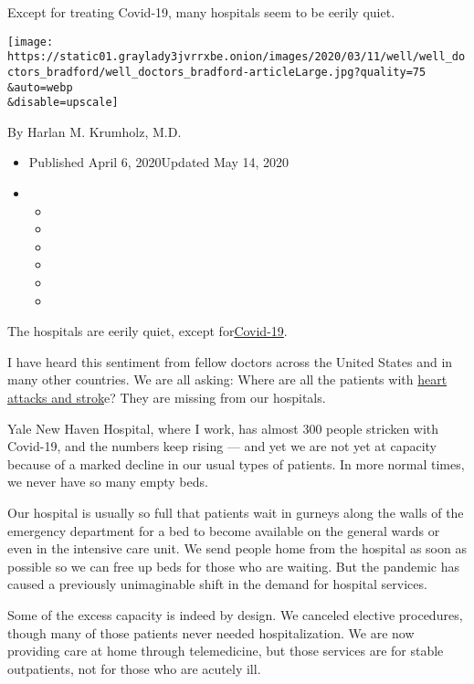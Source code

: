 Except for treating Covid-19, many hospitals seem to be eerily quiet.

\texttt{[image: https://static01.graylady3jvrrxbe.onion/images/2020/03/11/well/well\_doctors\_bradford/well\_doctors\_bradford-articleLarge.jpg?quality=75\\\&auto=webp\\\&disable=upscale]}

By Harlan M. Krumholz, M.D.

\begin{itemize}
\item
  Published April 6, 2020Updated May 14, 2020
\item
  \begin{itemize}
  \item
  \item
  \item
  \item
  \item
  \item
  \end{itemize}
\end{itemize}

The hospitals are eerily quiet, except
for\href{https://www.nytimes3xbfgragh.onion/2020/05/14/health/coronavirus-strokes.html}{Covid-19}.

I have heard this sentiment from fellow doctors across the United States
and in many other countries. We are all asking: Where are all the
patients with
\href{https://www.nytimes3xbfgragh.onion/2020/05/14/health/coronavirus-strokes.html}{heart
attacks and strok}e? They are missing from our hospitals.

Yale New Haven Hospital, where I work, has almost 300 people stricken
with Covid-19, and the numbers keep rising --- and yet we are not yet at
capacity because of a marked decline in our usual types of patients. In
more normal times, we never have so many empty beds.

Our hospital is usually so full that patients wait in gurneys along the
walls of the emergency department for a bed to become available on the
general wards or even in the intensive care unit. We send people home
from the hospital as soon as possible so we can free up beds for those
who are waiting. But the pandemic has caused a previously unimaginable
shift in the demand for hospital services.

Some of the excess capacity is indeed by design. We canceled elective
procedures, though many of those patients never needed hospitalization.
We are now providing care at home through telemedicine, but those
services are for stable outpatients, not for those who are acutely ill.

